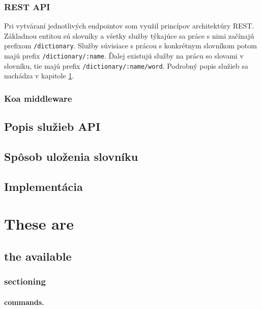\documentclass[
  digital, %
  table,   %
  lof,     %
  lot,     %
]{fithesis3}
\begin{document}
\subsection{REST API}
Pri vytváraní jednotlivých endpointov som využil princípov architektúry REST. Základnou entitou sú slovníky a všetky služby týkajúce sa práce s nimi začínajú prefixom \texttt{/dictionary}. Služby súvisiace s prácou s konkrétnym slovníkom potom majú prefix \texttt{/dictionary/:name}. Ďalej existujú služby na prácu so slovami v slovníku, tie majú prefix \texttt{/dictionary/:name/word}. Podrobný popis služieb sa nachádza v kapitole \ref{sec:api}.

\subsection{Koa middleware}


\section{Popis služieb API} \label{sec:api}


\section{Spôsob uloženia slovníku}
\section{Implementácia}

\chapter{These are}
\section{the available}
\subsection{sectioning}
\subsubsection{commands.}
\end{document}
